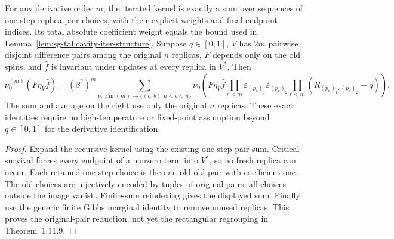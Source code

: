 \begin{lemma}\label{lem:sg-tal:hanen-critical-choices}
\leanok
{}
For any derivative order $m$, the iterated kernel is exactly a sum over sequences
of one-step replica-pair choices, with their explicit weights and final endpoint
indices. Its total absolute coefficient weight equals the bound used in
Lemma~\ref{lem:sg-tal:cavity-iter-structure}.
Suppose $q\in[0,1]$, $V$ has $2m$ pairwise disjoint difference pairs among the
original $n$ replicas, $F$ depends only on the old spins, and $\hat f$ is
invariant under updates at every replica in $V^*$. Then
\[
 \nu_0^{(m)}(F\eta_V\hat f)
 = (\beta^2)^m
   \sum_{p:\operatorname{Fin}(m)\to\{(a,b):a<b<n\}}
   \nu_0\left(F\eta_V\hat f
     \prod_{r<m}\varepsilon_{(p_r)_1}\varepsilon_{(p_r)_2}
     \prod_{r<m}(R^-_{(p_r)_1,(p_r)_2}-q)\right).
\]
The sum and average on the right use only the original $n$ replicas. These exact
identities require no high-temperature or fixed-point assumption beyond
$q\in[0,1]$ for the derivative identification.
\end{lemma}
\begin{proof}
\leanok
Expand the recursive kernel using the existing one-step pair sum. Critical
survival forces every endpoint of a nonzero term into $V^*$, so no fresh replica
can occur. Each retained one-step choice is then an old-old pair with coefficient
one. The old choices are injectively encoded by tuples of original pairs;
all choices outside the image vanish. Finite-sum reindexing gives the displayed
sum. Finally use the generic finite Gibbs marginal identity to remove unused
replicas. This proves the original-pair reduction, not yet the rectangular
regrouping in Theorem~1.11.9.
\end{proof}

